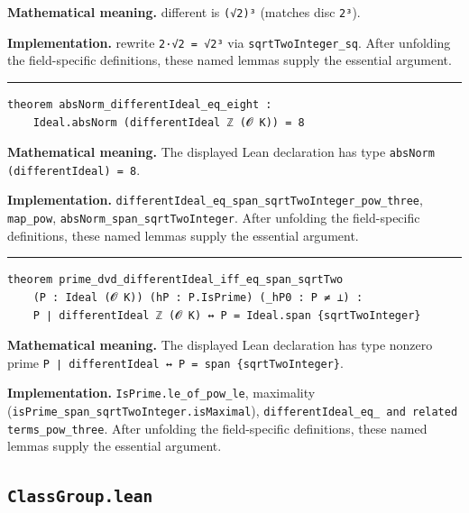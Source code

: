 \documentclass[UTF8,a4paper,11pt,fontset=fandol]{ctexart}
\theoremstyle{definition}
\newcommand{\statementsep}{\par\medskip\hrule\medskip}
\begin{document}
\noindent\textbf{Mathematical meaning.} different is \texttt{(√2)³} (matches disc \texttt{2³}).\par
\noindent\textbf{Implementation.} rewrite \texttt{2·√2 = √2³} via \texttt{sqrtTwoInteger\_\allowbreak{}sq}. After unfolding the field-specific definitions, these named lemmas supply the essential argument.\par
\statementsep
\begin{verbatim}
theorem absNorm_differentIdeal_eq_eight :
    Ideal.absNorm (differentIdeal ℤ (𝓞 K)) = 8
\end{verbatim}
\noindent\textbf{Mathematical meaning.} The displayed Lean declaration has type \texttt{absNorm (differentIdeal) = 8}.\par
\noindent\textbf{Implementation.} \texttt{differentIdeal\_\allowbreak{}eq\_\allowbreak{}span\_\allowbreak{}sqrtTwoInteger\_\allowbreak{}pow\_\allowbreak{}three}, \texttt{map\_\allowbreak{}pow}, \texttt{absNorm\_\allowbreak{}span\_\allowbreak{}sqrtTwoInteger}. After unfolding the field-specific definitions, these named lemmas supply the essential argument.\par
\statementsep
\begin{verbatim}
theorem prime_dvd_differentIdeal_iff_eq_span_sqrtTwo
    (P : Ideal (𝓞 K)) (hP : P.IsPrime) (_hP0 : P ≠ ⊥) :
    P ∣ differentIdeal ℤ (𝓞 K) ↔ P = Ideal.span {sqrtTwoInteger}
\end{verbatim}
\noindent\textbf{Mathematical meaning.} The displayed Lean declaration has type nonzero prime \texttt{P ∣ differentIdeal ↔ P = span \{sqrtTwoInteger\}}.\par
\noindent\textbf{Implementation.} \texttt{IsPrime.\allowbreak{}le\_\allowbreak{}of\_\allowbreak{}pow\_\allowbreak{}le}, maximality (\texttt{isPrime\_\allowbreak{}span\_\allowbreak{}sqrtTwoInteger.\allowbreak{}isMaximal}), \texttt{differentIdeal\_\allowbreak{}eq\_\allowbreak{} and related terms\_\allowbreak{}pow\_\allowbreak{}three}. After unfolding the field-specific definitions, these named lemmas supply the essential argument.\par

\subsection{\texttt{ClassGroup.lean}}
\end{document}
